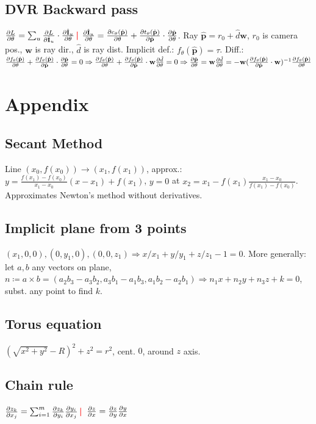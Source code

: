 \documentclass[11pt,landscape,a4paper,fleqn]{article}
\newcommand{\sep}{\,\textcolor{red}{\bm|}\,}
\def\myvector#1{\mathbf{#1}}
\def\vp{{\myvector{p}}}
\def\vw{{\myvector{w}}}
\def\mymatrix#1{\mathbf{#1}}
\def\mI{{\mymatrix{I}}}
\begin{document}
\begin{multicols*}{4}
\subsection*{DVR Backward pass}
$\pdv{L}{\theta} = \sum_u \pdv{L}{\hat\mI_u} \cdot \pdv{\hat\mI_u}{\theta} \sep\!$
$\pdv{\hat\mI_u}{\theta} = \pdv{c_\theta(\hat\vp)}{\theta} + \pdv{t_\theta(\hat\vp)}{\hat\vp}
 \cdot \pdv{\hat\vp}{\theta}$.
Ray $\hat\vp = r_0 + \hat{d}\vw$,
$r_0$ is camera pos., $\vw$ is ray dir., $\hat{d}$ is ray dist.
Implicit def.: $f_\theta(\hat\vp) = \tau$.
Diff.:
$\pdv{f_\theta(\hat\vp)}{\theta} + \pdv{f_\theta(\hat\vp)}{\hat\vp} \cdot \pdv{\hat\vp}{\theta} = 0 \Rightarrow
\pdv{f_\theta(\hat\vp)}{\theta} + \pdv{f_\theta(\hat\vp)}{\hat\vp} \cdot \vw\pdv{\hat{d}}{\theta} = 0 \Rightarrow 
\pdv{\hat\vp}{\theta} = \vw \pdv{\hat{d}}{\theta} = - \vw(\pdv{f_\theta(\hat{\vp})}{\hat{\vp}} \cdot \vw)^{-1}
\pdv{f_\theta(\hat\vp)}{\theta}$

\section{Appendix}

\subsection*{Secant Method}

Line $(x_0, f(x_0)) \to (x_1, f(x_1))$, approx.:
$y = \frac{f(x_1) - f(x_0)}{x_1 - x_0}(x - x_1) + f(x_1)$,
$y = 0$ at $x_2 = x_1 - f(x_1) \frac{x_1 - x_0}{f(x_1) - f(x_0)}$.
Approximates Newton's method without derivatives.

\subsection*{Implicit plane from 3 points}

$(x_1, 0, 0), (0, y_1, 0), (0, 0, z_1) \Rightarrow x / x_1 + y / y_1 + z / z_1 - 1 = 0$.
More generally: let $a, b$ any vectors on plane,
$n \coloneqq a \times b = (a_2 b_3 - a_3 b_2, a_3b_1 - a_1b_3, a_1b_2 - a_2b_1) \Rightarrow n_1 x + n_2 y + n_3 z + k = 0$,
subst. any point to find $k$.

\subsection*{Torus equation}

\!\!\!\!$(\sqrt{x^2 + y^2} - R)^2 + z^2 = r^2$, cent. $0$, around $z$ axis.

\subsection*{Chain rule}
$\pdv{z_k}{x_j} = \sum_{i=1}^{m} \pdv{z_k}{y_i} \pdv{y_i}{x_j} \sep$
$\pdv{z}{x} = \pdv{z}{y} \pdv{y}{x}$



\end{multicols*}
\end{document}
